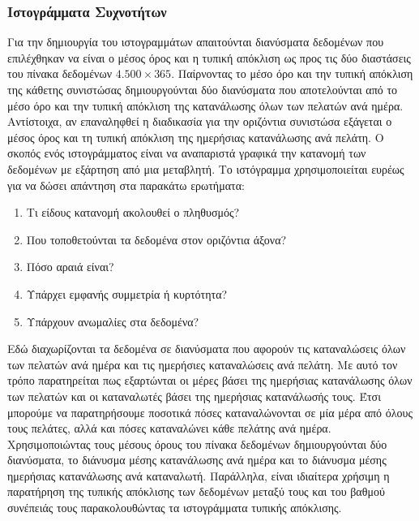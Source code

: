 \subsubsection{Ιστογράμματα Συχνοτήτων}
Για την δημιουργία του ιστογραμμάτων απαιτούνται διανύσματα δεδομένων που επιλέχθηκαν να είναι ο μέσος  όρος και η τυπική απόκλιση ως προς τις δύο διαστάσεις του πίνακα δεδομένων $4.500 \times 365$. Παίρνοντας το μέσο όρο και την τυπική απόκλιση της κάθετης συνιστώσας δημιουργούνται δύο διανύσματα που αποτελούνται από το μέσο όρο και την τυπική απόκλιση της κατανάλωσης όλων των πελατών ανά ημέρα. Αντίστοιχα, αν επαναληφθεί η διαδικασία για την οριζόντια συνιστώσα εξάγεται ο μέσος όρος και τη τυπική απόκλιση της ημερήσιας κατανάλωσης ανά πελάτη. Ο σκοπός ενός ιστογράμματος είναι να αναπαριστά γραφικά την κατανομή των δεδομένων με εξάρτηση από μια μεταβλητή. Το ιστόγραμμα χρησιμοποιείται ευρέως για να δώσει απάντηση στα παρακάτω ερωτήματα\cite{histogram}:\par
\begin{enumerate}
\item Τι είδους κατανομή ακολουθεί ο πληθυσμός?
\item Που τοποθετούνται τα δεδομένα στον οριζόντια άξονα?
\item Πόσο αραιά είναι?
\item Υπάρχει εμφανής συμμετρία ή κυρτότητα?
\item Υπάρχουν ανωμαλίες στα δεδομένα?
\end{enumerate}
Εδώ διαχωρίζονται τα δεδομένα σε διανύσματα που αφορούν τις καταναλώσεις όλων των πελατών ανά ημέρα και τις ημερήσιες καταναλώσεις ανά πελάτη. Με αυτό τον τρόπο παρατηρείται πως εξαρτώνται οι μέρες βάσει της ημερήσιας κατανάλωσης όλων των πελατών και οι καταναλωτές βάσει της ημερήσιας  κατανάλωσής τους. Έτσι μπορούμε να παρατηρήσουμε ποσοτικά πόσες  καταναλώνονται σε μία μέρα από όλους τους πελάτες, αλλά και πόσες  καταναλώνει κάθε πελάτης ανά ημέρα. Χρησιμοποιώντας τους μέσους όρους του πίνακα δεδομένων δημιουργούνται δύο διανύσματα, το διάνυσμα μέσης κατανάλωσης ανά ημέρα και το διάνυσμα μέσης ημερήσιας κατανάλωσης ανά καταναλωτή.  Παράλληλα, είναι ιδιαίτερα χρήσιμη η παρατήρηση της τυπικής απόκλισης των δεδομένων μεταξύ τους και του βαθμού συνέπειάς τους παρακολουθώντας τα ιστογράμματα τυπικής απόκλισης.\par


